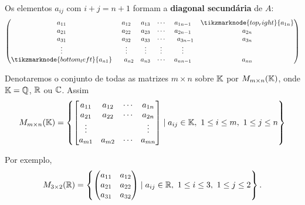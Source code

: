 
Os elementos $a_{ij}$ com $i + j = n + 1$ formam a \textbf{diagonal secundária} de $A$:
\[
	\begin{pmatrix}
		a_{11} & a_{12} & a_{13} & \cdots  & a_{1n-1} & \tikzmarknode{top_right}{a_{1n}}\\ 
		a_{21} & a_{22} & a_{23} & \cdots  & a_{2n-1} & a_{2n}\\ 
		a_{31} & a_{32} & a_{33} & \cdots  & \phantom{-}a_{3n-1} & a_{3n}\\ 
		\vdots  & \vdots   & \vdots  & \vdots  & \vdots\\ 
		\tikzmarknode{bottom_left}{a_{n1}} & \phantom{-} a_{n2} & a_{n3} & \cdots  & a_{nn-1} & {a_{nn}}\\ 
	\end{pmatrix}
\]


\begin{notacao}
	Denotaremos o conjunto de todas as matrizes $m \times n$ sobre $\mathbb{K}$ por $M_{m\times n}(\mathbb{K})$, onde $\mathbb{K} = \mathbb{Q}$, $\mathbb{R}$ ou $\mathbb{C}$. Assim
	\[
		M_{m \times n}(\mathbb{K}) = \left\{\begin{bmatrix}
			a_{11} & a_{12} & \cdots & a_{1n}\\
			a_{21} & a_{22} & \cdots & a_{2n}\\
			\vdots & & & \vdots\\
		a_{m1} & a_{m2} & \cdots & a_{mn}\end{bmatrix} \mid a_{ij} \in \mathbb{K},\ 1 \le i \le m,\ 1 \le j \le n
		\right\}
	\]
\end{notacao}

Por exemplo,
\[
	M_{3\times 2}(\mathbb{R}) = \left\{\begin{pmatrix}a_{11} & a_{12}\\a_{21} & a_{22}\\ a_{31} & a_{32}\end{pmatrix} \mid a_{ij} \in \mathbb{R},\ 1 \le i \le 3,\ 1 \le j \le 2\right\}.
\]


